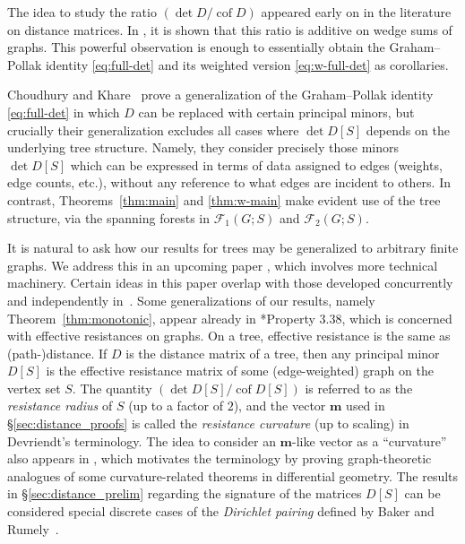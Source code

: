 \documentclass[12pt]{amsart}
\theoremstyle{definition}
\newcommand{\boldm}{\mathbf{m}}
\DeclareMathOperator{\cof}{cof}
\newcommand{\forests}{\mathcal{F}}
\newcommand\farbod[1]{\footnote{[\textcolor{orange}{(Farbod)} \textcolor{blue}{#1}]}}
\begin{document}

The idea to study the ratio $({\det D}/{\cof D})$ appeared early on in the literature on distance matrices.
In \cite{graham-hoffman-hosoya}, it is shown that this ratio is additive on wedge sums of graphs.
This powerful observation is enough to essentially obtain the Graham--Pollak identity \eqref{eq:full-det} and its weighted version \eqref{eq:w-full-det} as corollaries.

Choudhury and Khare~\cite{choudhury-khare} prove a generalization of the Graham--Pollak identity \eqref{eq:full-det} in which $D$ can be replaced with certain principal minors, but crucially their generalization excludes all cases where $\det D[S]$ depends on the underlying tree structure.
Namely, they consider precisely those minors $\det D[S]$ which can be expressed in terms of data assigned to edges (weights, edge counts, etc.), without any reference to what edges are incident to others.
In contrast, Theorems~\ref{thm:main} and \ref{thm:w-main} make evident use of the tree structure, via the spanning forests in $\forests_1(G; S)$ and $\forests_2(G; S)$.

It is natural to ask how our results for trees may be generalized to arbitrary finite graphs. We address this in an upcoming paper \cite{richman-shokrieh-wu}, which involves more technical machinery.
Certain ideas in this paper overlap with those developed concurrently and independently in~\cites{devriendt-thesis}.
Some generalizations of our results, namely Theorem~\ref{thm:monotonic}, appear already in \cite{devriendt-thesis}*{Property 3.38}, which is concerned with effective resistances on graphs.
On a tree, effective resistance is the same as (path-)distance.
If $D$ is the distance matrix of a tree, then any principal minor $D[S]$ is the effective resistance matrix of some (edge-weighted) graph on the vertex set $S$.
The quantity $(\det D[S] / \cof D[S])$ is referred to as the {\em resistance radius} of $S$ (up to a factor of $2$),
and the vector $\boldm$ used in \S\ref{sec:distance_proofs} is called the {\em resistance curvature} (up to scaling) in Devriendt's terminology.
The idea to consider an $\boldm$-like vector as a ``curvature'' also appears in \cite{steinerberger}, which motivates the terminology by proving graph-theoretic analogues of some curvature-related theorems in differential geometry. 
The results in \S\ref{sec:distance_prelim} regarding the signature of the matrices $D[S]$ can be considered special discrete cases of the {\em Dirichlet pairing} defined by
Baker and Rumely~\cite{baker-rumely}.
\end{document}
